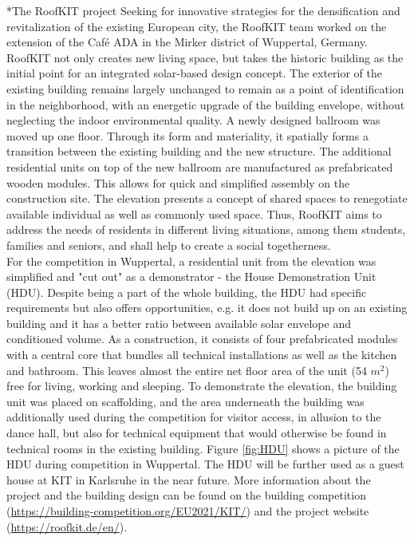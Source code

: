 \documentclass[twocolumn, a4paper,10pt]{article}
\makeatletter
\renewcommand\section{\@startsection{section}{1}{\z@}{3pt}{3pt}{\normalfont\large\bfseries}}
\makeatother
\begin{document}
\section*{The RoofKIT project}
Seeking for innovative strategies for the densification and revitalization of the existing European city, the RoofKIT team worked on the extension of the Café ADA in the Mirker district of Wuppertal, Germany. RoofKIT not only creates new living space, but takes the historic building as the initial point for an integrated solar-based design concept. The exterior of the existing building remains largely unchanged to remain as a point of identification in the neighborhood, with an energetic upgrade of the building envelope, without neglecting the indoor environmental quality. A newly designed ballroom was moved up one floor. Through its form and materiality, it spatially forms a transition between the existing building and the new structure. The additional residential units on top of the new ballroom are manufactured as prefabricated wooden modules. This allows for quick and simplified assembly on the construction site. The elevation presents a concept of shared spaces to renegotiate available individual as well as commonly used space. Thus, RoofKIT aims to address the needs of residents in different living situations, among them students, families and seniors, and shall help to create a social togetherness.\\
For the competition in Wuppertal, a residential unit from the elevation was simplified and "cut out" as a demonstrator - the House Demonstration Unit (HDU). Despite being a part of the whole building, the HDU had specific requirements but also offers opportunities, e.g. it does not build up on an existing building and it has a better ratio between available solar envelope and conditioned volume. As a construction, it consists of four prefabricated modules with a central core that bundles all technical installations as well as the kitchen and bathroom. This leaves almost the entire net floor area of the unit (54 $m^2$) free for living, working and sleeping. To demonstrate the elevation, the building unit was placed on scaffolding, and the area underneath the building was additionally used during the competition for visitor access, in allusion to the dance hall, but also for technical equipment that would otherwise be found in technical rooms in the existing building. Figure \ref{fig:HDU} shows a picture of the HDU during competition in Wuppertal. The HDU will be further used as a guest house at KIT in Karlsruhe in the near future. More information about the project and the building design can be found on the building competition (\textcolor{blue}{\url{https://building-competition.org/EU2021/KIT/}}) and the project website (\textcolor{blue}{\url{https://roofkit.de/en/}}).
\end{document}
